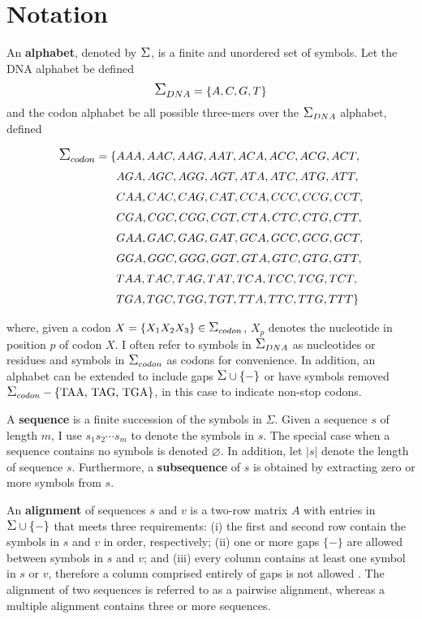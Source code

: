 \section{Notation}

An \textbf{alphabet}, denoted by $\grande{\Sigma}$, is a finite and unordered set of symbols. Let the DNA alphabet be defined
\[ \grande{\Sigma}_{DNA} = \{ A, C, G, T \} \]
and the codon alphabet be all possible three-mers over the $\grande{\Sigma}_{DNA}$ alphabet, defined

\begin{align*}
\allowdisplaybreaks
\grande{\Sigma}_{codon} = \{&AAA, AAC, AAG, AAT, ACA, ACC, ACG, ACT,\\
                   &AGA, AGC, AGG, AGT, ATA, ATC, ATG, ATT,\\
                   &CAA, CAC, CAG, CAT, CCA, CCC, CCG, CCT,\\
                   &CGA, CGC, CGG, CGT, CTA, CTC, CTG, CTT,\\
                   &GAA, GAC, GAG, GAT, GCA, GCC, GCG, GCT,\\
                   &GGA, GGC, GGG, GGT, GTA, GTC, GTG, GTT,\\
                   &TAA, TAC, TAG, TAT, TCA, TCC, TCG, TCT,\\
                   &TGA, TGC, TGG, TGT, TTA, TTC, TTG, TTT\}
\end{align*}

\noindent where, given a codon $X = \{X_1 X_2 X_3\} \in \grande{\Sigma}_{codon}$, $X_p$ denotes the nucleotide in position $p$ of codon $X$. I often refer to symbols in $\grande{\Sigma}_{DNA}$ as nucleotides or residues and symbols in $\grande{\Sigma}_{codon}$ as codons for convenience. In addition, an alphabet can be extended to include gaps $\grande{\Sigma} \cup \{-\}$ or have symbols removed $\grande{\Sigma}_{codon} - \{\text{TAA, TAG, TGA} \}$, in this case to indicate non-stop codons.

A \textbf{sequence} is a finite succession of the symbols in $\Sigma$. Given a sequence $s$ of length $m$, I use $s_1 s_2 \cdots s_{m}$ to denote the symbols in $s$. The special case when a sequence contains no symbols is denoted $\varnothing$. In addition, let $|s|$ denote the length of sequence $s$. Furthermore, a \textbf{subsequence} of $s$ is obtained by extracting zero or more symbols from $s$.

An \textbf{alignment} of sequences $s$ and $v$ is a two-row matrix $A$ with entries in $\grande{\Sigma} \cup \{-\}$ that meets three requirements: (i) the first and second row contain the symbols in $s$ and $v$ in order, respectively; (ii) one or more gaps $\{-\}$ are allowed between symbols in $s$ and $v$; and (iii) every column contains at least one symbol in $s$ or $v$, therefore a column comprised entirely of gaps is not allowed \citep{orlova2010mathematical}. The alignment of two sequences is referred to as a pairwise alignment, whereas a multiple alignment contains three or more sequences.

